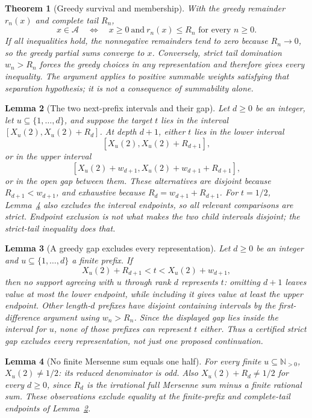 \documentclass[11pt]{article}
\theoremstyle{plain}
\newtheorem{thm}{Theorem}[section]
\newtheorem{lem}[thm]{Lemma}
\theoremstyle{definition}
\theoremstyle{remark}
\begin{document}
\begin{thm}[Greedy survival and membership]
\label{thm:greedy-survival-catalogue}
With the greedy remainder $r_n(x)$ and complete tail $R_n$,
\[
 x\in\mathcal A\quad\Longleftrightarrow\quad
 x\ge0\ \text{and}\ r_n(x)\le R_n\text{ for every }n\ge0.
\]
If all inequalities hold, the nonnegative remainders tend to zero
because $R_n\to0$, so the greedy partial sums converge to $x$.
Conversely, strict tail domination $w_n>R_n$ forces the greedy
choices in any representation and therefore gives every inequality.
The argument applies to positive summable weights satisfying that
separation hypothesis; it is not a consequence of summability alone.
\end{thm}

\begin{lem}[The two next-prefix intervals and their gap]
\label{lem:rank-step-trichotomy}
Let $d\ge0$ be an integer, let $u\subseteq\{1,\ldots,d\}$, and suppose the target $t$ lies
in the interval
$[X_u(2),X_u(2)+R_d]$.
At depth $d+1$, either $t$ lies in the lower interval
\[
 [X_u(2),X_u(2)+R_{d+1}],
\]
or in the upper interval
\[
 [X_u(2)+w_{d+1},X_u(2)+w_{d+1}+R_{d+1}],
\]
or in the open gap between them.  These alternatives are disjoint
because $R_{d+1}<w_{d+1}$, and exhaustive because
$R_d=w_{d+1}+R_{d+1}$.
For $t=1/2$, Lemma~\ref{lem:half-endpoint-kills} also excludes
the interval endpoints, so all relevant comparisons are strict.
Endpoint exclusion is not what makes the two child intervals
disjoint; the strict-tail inequality does that.
\end{lem}

\begin{lem}[A greedy gap excludes every representation]
\label{lem:fatal-gap-exclusion}
Let $d\ge0$ be an integer and $u\subseteq\{1,\ldots,d\}$ a finite prefix.  If
\[
 X_u(2)+R_{d+1}<t<X_u(2)+w_{d+1},
\]
then no support agreeing with $u$ through rank $d$ represents $t$:
omitting $d+1$ leaves value at most the lower endpoint, while
including it gives value at least the upper endpoint.
Other length-$d$ prefixes have disjoint containing intervals by
the first-difference argument using $w_n>R_n$.  Since the displayed
gap lies inside the interval for $u$, none of those prefixes can
represent $t$ either.  Thus a certified strict gap excludes every
representation, not just one proposed continuation.
\end{lem}

\begin{lem}[No finite Mersenne sum equals one half]
\label{lem:half-endpoint-kills}
For every finite $u\subseteq\mathbb N_{>0}$,
$X_u(2)\ne1/2$: its reduced denominator is odd.
Also $X_u(2)+R_d\ne1/2$ for every $d\ge0$, since $R_d$
is the irrational full Mersenne sum minus a finite rational sum.
These observations exclude equality at the finite-prefix and
complete-tail endpoints of Lemma~\ref{lem:rank-step-trichotomy}.
\end{lem}
\end{document}
